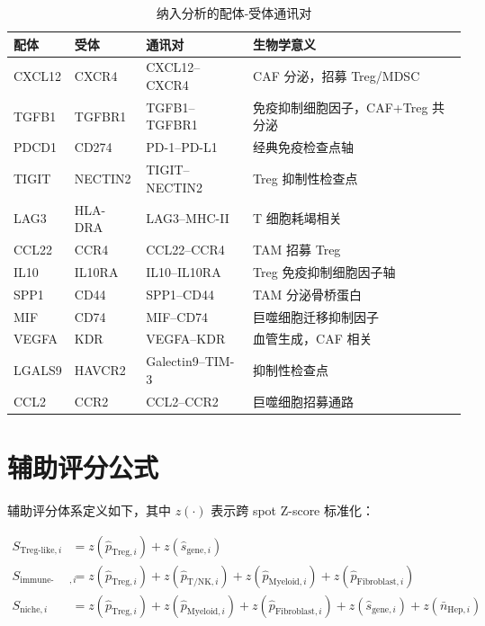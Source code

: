 \documentclass[12pt, a4paper]{ctexart}
\begin{document}
\begin{table}[H]
\centering
\caption{纳入分析的配体-受体通讯对}
\label{tab:lr_pairs}
\begin{tabularx}{\textwidth}{lllX}
\toprule
\textbf{配体} & \textbf{受体} & \textbf{通讯对} & \textbf{生物学意义} \\
\midrule
CXCL12 & CXCR4   & CXCL12--CXCR4  & CAF 分泌，招募 Treg/MDSC~\citep{domanska2013targeting} \\
TGFB1  & TGFBR1  & TGFB1--TGFBR1  & 免疫抑制细胞因子，CAF+Treg 共分泌~\citep{mariathasan2018tgfb} \\
PDCD1  & CD274   & PD-1--PD-L1    & 经典免疫检查点轴~\citep{sharma2023immunosuppressive} \\
TIGIT  & NECTIN2 & TIGIT--NECTIN2 & Treg 抑制性检查点~\citep{sakaguchi2020regulatory} \\
LAG3   & HLA-DRA & LAG3--MHC-II   & T 细胞耗竭相关~\citep{sharma2023immunosuppressive} \\
CCL22  & CCR4    & CCL22--CCR4    & TAM 招募 Treg~\citep{curiel2004specific} \\
IL10   & IL10RA  & IL10--IL10RA   & Treg 免疫抑制细胞因子轴~\citep{noy2014tumor} \\
SPP1   & CD44    & SPP1--CD44     & TAM 分泌骨桥蛋白~\citep{biswas2012macrophage} \\
MIF    & CD74    & MIF--CD74      & 巨噬细胞迁移抑制因子~\citep{noy2014tumor} \\
VEGFA  & KDR     & VEGFA--KDR     & 血管生成，CAF 相关~\citep{kalluri2016biology} \\
LGALS9 & HAVCR2  & Galectin9--TIM-3 & 抑制性检查点~\citep{sharma2023immunosuppressive} \\
CCL2   & CCR2    & CCL2--CCR2     & 巨噬细胞招募通路~\citep{biswas2012macrophage} \\
\bottomrule
\end{tabularx}
\end{table}

\section{辅助评分公式}
\label{app:scores}

辅助评分体系定义如下，其中 $z(\cdot)$ 表示跨 spot Z-score 标准化：

\begin{align}
S_{\text{Treg-like},i} &= z(\hat{p}_{\text{Treg},i}) + z(\hat{s}_{\text{gene},i}) \\
S_{\text{immune-stroma},i} &= z(\hat{p}_{\text{Treg},i}) + z(\hat{p}_{\text{T/NK},i}) + z(\hat{p}_{\text{Myeloid},i}) + z(\hat{p}_{\text{Fibroblast},i}) \\
S_{\text{niche},i} &= z(\hat{p}_{\text{Treg},i}) + z(\hat{p}_{\text{Myeloid},i}) + z(\hat{p}_{\text{Fibroblast},i}) + z(\hat{s}_{\text{gene},i}) + z(\bar{n}_{\text{Hep},i})
\end{align}
\end{document}

